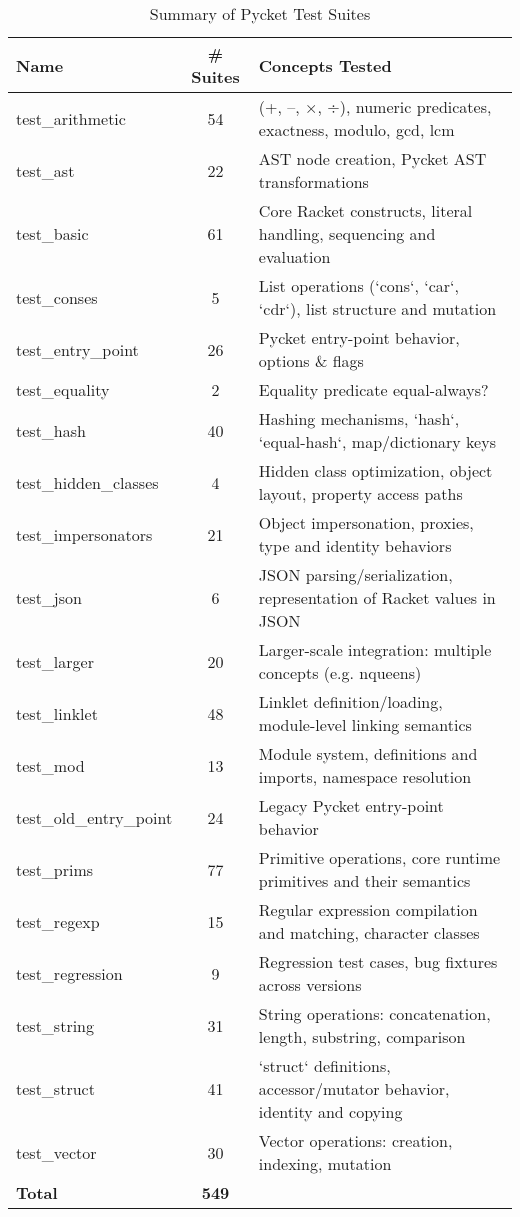 \begin{table}[!h]
  \centering
  \begin{tabular}{lc>{\footnotesize}l}
    \textbf{Name} & \textbf{\# Suites} & {\normalsize\textbf{Concepts Tested}} \\
    \hline \hline
    test\_arithmetic        & 54  & (+, –, ×, ÷), numeric predicates, exactness, modulo, gcd, lcm \\
    test\_ast               & 22  & AST node creation, Pycket AST transformations \\
    test\_basic             & 61  & Core Racket constructs, literal handling, sequencing and evaluation \\
    test\_conses            & 5   & List operations (`cons`, `car`, `cdr`), list structure and mutation \\
    test\_entry\_point      & 26  & Pycket entry-point behavior, options \& flags \\
    test\_equality          & 2   & Equality predicate equal-always? \\
    test\_hash              & 40  & Hashing mechanisms, `hash`, `equal-hash`, map/dictionary keys \\
    test\_hidden\_classes   & 4   & Hidden class optimization, object layout, property access paths \\
    test\_impersonators     & 21  & Object impersonation, proxies, type and identity behaviors \\
    test\_json              & 6   & JSON parsing/serialization, representation of Racket values in JSON \\
    test\_larger            & 20  & Larger-scale integration: multiple concepts (e.g. nqueens) \\
    test\_linklet           & 48  & Linklet definition/loading, module-level linking semantics \\
    test\_mod               & 13  & Module system, definitions and imports, namespace resolution \\
    test\_old\_entry\_point & 24  & Legacy Pycket entry-point behavior \\
    test\_prims             & 77  & Primitive operations, core runtime primitives and their semantics \\
    test\_regexp            & 15  & Regular expression compilation and matching, character classes \\
    test\_regression        & 9   & Regression test cases, bug fixtures across versions \\
    test\_string            & 31  & String operations: concatenation, length, substring, comparison \\
    test\_struct            & 41  & `struct` definitions, accessor/mutator behavior, identity and copying \\
    test\_vector            & 30  & Vector operations: creation, indexing, mutation \\
    \hline
    \addlinespace[4pt]
    \textbf{Total} & \textbf{549} & \\
  \end{tabular}
  \caption{Summary of Pycket Test Suites}
  \label{table:validation-test-suites-table}
\end{table}
